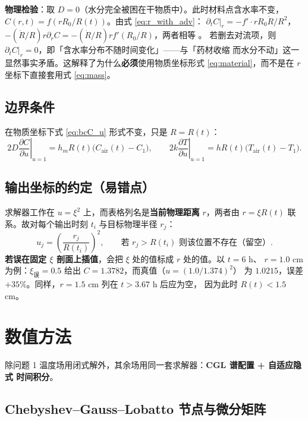\documentclass[11pt,a4paper]{article}
\theoremstyle{definition}
\begin{document}
\textbf{物理检验}：取 $D=0$（水分完全被困在干物质中）。此时材料点含水率不变，
$C(r,t)=f(rR_0/R(t))$。由式 \eqref{eq:r_with_adv}：
$\partial_tC|_r=-f'\cdot rR_0\dot R/R^2$，
$-(\dot R/R)r\partial_rC=-(\dot R/R)r f'(R_0/R)$，两者相等 \checkmark。
若删去对流项，则 $\partial_tC|_r=0$，即「含水率分布不随时间变化」——与「药材收缩
而水分不动」这一显然事实矛盾。这解释了为什么\textbf{必须}使用物质坐标形式
\eqref{eq:material}，而不是在 $r$ 坐标下直接套用式 \eqref{eq:mass}。

\subsection{边界条件}

在物质坐标下式 \eqref{eq:bcC_u} 形式不变，只是 $R=R(t)$：
\begin{equation}
2D\left.\frac{\partial C}{\partial u}\right|_{u=1}=h_mR(t)\big(C_{\mathrm{air}}(t)-C_1\big),
\qquad
2k\left.\frac{\partial T}{\partial u}\right|_{u=1}=hR(t)\big(T_{\mathrm{air}}(t)-T_1\big).
\end{equation}

\subsection{输出坐标的约定（易错点）}

求解器工作在 $u=\xi^2$ 上，而表格列名是\textbf{当前物理距离} $r$，两者由 $r=\xi R(t)$
联系。故对每个输出时刻 $t_i$ 与目标物理半径 $r_j$：
\[
u_j=\left(\frac{r_j}{R(t_i)}\right)^2,
\qquad
\text{若 } r_j>R(t_i) \text{ 则该位置不存在（留空）}.
\]
\textbf{若误在固定 $\xi$ 剖面上插值}，会把 $\xi$ 处的值标成 $r$ 处的值。以 $t=6$ h、
$r=1.0$ cm 为例：$\xi_{\text{误}}=0.5$ 给出 $C=1.3782$，而真值（$u=(1.0/1.374)^2$）
为 $1.0215$，误差 $+35\%$。同样，$r=1.5$ cm 列在 $t>3.67$ h 后应为空，
因为此时 $R(t)<1.5$ cm。

\section{数值方法}

除问题 1 温度场用闭式解外，其余场用同一套求解器：\textbf{CGL 谱配置 + 自适应隐式
时间积分}。

\subsection{Chebyshev--Gauss--Lobatto 节点与微分矩阵}
\end{document}
